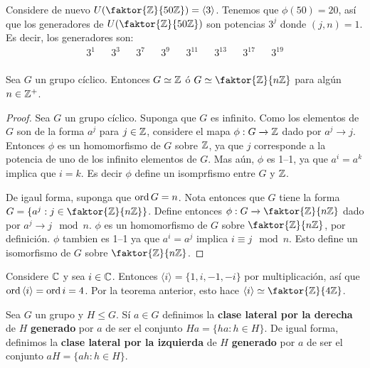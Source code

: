 \begin{example}\label{}
    Considere de nuevo $U(\faktor{\Z}{50\Z})=\langle 3 \rangle$. Tenemos que
    $\phi(50)=20$, as\'i que los generadores de $U(\faktor{\Z}{50\Z})$ son
    potencias $3^j$ donde  $(j,n)=1$. Es decir, los generadores son:
    \begin{align*}
        3^1 &&  3^3 &&  3^7 &&  3^9 &&  3^{11}  &&  3^{13}  &&  3^{17}  &&  3^{19}  \\
    \end{align*}
\end{example}

\begin{theorem}\label{thm_3.5}
Sea $G$ un grupo c\'iclico. Entonces  $G \simeq \mathbb{Z}$ \'o  $G \simeq
\faktor{\Z}{n\Z}$ para alg\'un $n \in \mathbb{Z}^+$.
\end{theorem}
\begin{proof}
    Sea $G$ un grupo c\'iclico. Suponga que  $G$ es infinito. Como los elementos
    de  $G$ son de la forma  $a^j$ para  $j \in \mathbb{Z}$, considere el mapa  $\phi:G
    \xrightarrow{} \mathbb{Z}$ dado por $a^j \xrightarrow{} j$. Entonces $\phi$ es un
    homomorfismo de  $G$ sobre  $\mathbb{Z}$, ya que  $j$ corresponde a la potencia de
    uno de los infinito elementos de $G$. Mas a\'un, $\phi$ es 1--1, ya que
    $a^i=a^k$ implica que $i=k$. Es decir  $\phi$ define un isomprfismo entre
    $G$ y  $\mathbb{Z}$.

    De igaul forma, suponga que $\operatorname{ord}{G}=n$. Nota entonces que $G$ tiene la
    forma  $G=\{a^j : j \in \faktor{\Z}{n\Z}\}$. Define entonces $\phi:G
    \xrightarrow{} \faktor{\Z}{n\Z}$ dado por $a^j \xrightarrow{} j \mod{n}$.
    $\phi$ es un homomorfismo de  $G$ sobre  $\faktor{\Z}{n\Z}$, por
    definici\'on. $\phi$ tambien es  1--1 ya que  $a^i=a^j$ implica  $i \equiv j
    \mod{n}$. Esto define un isomorfismo de $G$ sobre  $\faktor{\Z}{n\Z}$.
\end{proof}

\begin{example}\label{}
    Considere $\mathbb{C}$ y sea  $i \in \mathbb{C}$. Entonces $\langle i \rangle=\{1,i,-1,-i\}$
    por multiplicaci\'on, as\'i que $\operatorname{ord}{\langle i \rangle}=\operatorname{ord}{i}=4$. Por la
    teorema anterior, esto hace $\langle i \rangle \simeq \faktor{\Z}{4\Z}$.
\end{example}

\begin{definition}
    Sea $G$ un grupo y  $H \leq G$. S\'i  $a \in G$ definimos la  \textbf{clase
    lateral por la derecha} de $H$  \textbf{generado} por $a$ de ser el conjunto
     $Ha=\{ha : h \in H\}$. De igual forma, definimos la \textbf{clase lateral
     por la izquierda} de $H$  \textbf{generado} por $a$ de ser el conjunto
     $aH=\{ah : h \in H\}$.
\end{definition}

